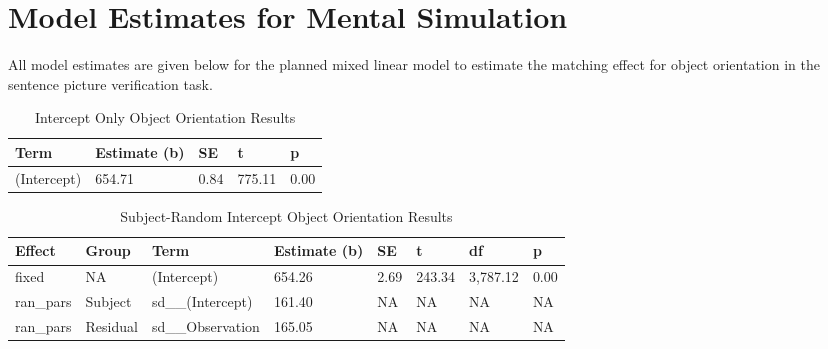 \documentclass[
  man,floatsintext]{apa7}
\begin{document}
\hypertarget{model-estimates-for-mental-simulation}{%
\section{Model Estimates for Mental Simulation}\label{model-estimates-for-mental-simulation}}

All model estimates are given below for the planned mixed linear model to estimate the matching effect for object orientation in the sentence picture verification task.

\newpage

\begin{table}[tbp]

\begin{center}
\begin{threeparttable}

\caption{\label{tab:intercept}Intercept Only Object Orientation Results}

\begin{tabular}{lllll}
\toprule
Term & Estimate (b) & SE & t & p\\
\midrule
(Intercept) & 654.71 & 0.84 & 775.11 & 0.00\\
\bottomrule
\end{tabular}

\end{threeparttable}
\end{center}

\end{table}

\begin{table}[tbp]

\begin{center}
\begin{threeparttable}

\caption{\label{tab:subject}Subject-Random Intercept Object Orientation Results}

\begin{tabular}{llllllll}
\toprule
Effect & Group & Term & Estimate (b) & SE & t & df & p\\
\midrule
fixed & NA & (Intercept) & 654.26 & 2.69 & 243.34 & 3,787.12 & 0.00\\
ran\_pars & Subject & sd\_\_(Intercept) & 161.40 & NA & NA & NA & NA\\
ran\_pars & Residual & sd\_\_Observation & 165.05 & NA & NA & NA & NA\\
\bottomrule
\end{tabular}

\end{threeparttable}
\end{center}

\end{table}
\end{document}
